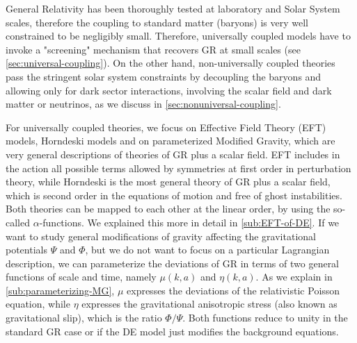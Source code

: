 General Relativity has been thoroughly tested at laboratory and Solar System scales, therefore the coupling to standard matter (baryons) is very well constrained to be negligibly small.
Therefore, universally coupled models have to invoke a "screening" mechanism that recovers GR at small scales (see \cref{sec:universal-coupling}).
On the other hand, non-universally coupled theories pass the stringent solar system constraints by decoupling the baryons
and allowing only for dark sector interactions, involving the scalar field and dark matter or neutrinos, as we discuss in \cref{sec:nonuniversal-coupling}.

For universally coupled theories, we focus on Effective Field Theory (EFT) models, Horndeski models and on parameterized Modified Gravity, which
are very general descriptions of theories of GR plus a scalar field.
EFT includes in the action all possible terms allowed by symmetries at first order in perturbation theory, while Horndeski is the most general theory
of GR plus a scalar field, which is second order in the equations of motion and free of ghost instabilities.
Both theories can be mapped to each other at the linear order, by using the so-called $\alpha$-functions.
We explained this more in detail in \cref{sub:EFT-of-DE}.
If we want to study general modifications of gravity affecting the gravitational potentials $\Psi$ and $\Phi$, but we do not want to focus on a particular Lagrangian description, we can parameterize the deviations of GR in terms of two
general functions of scale and time, namely $\mu(k,a)$ and $\eta(k,a)$. As we explain in \cref{sub:parameterizing-MG}, $\mu$ expresses the deviations of the relativistic Poisson equation, while $\eta$
expresses the gravitational anisotropic stress (also known as gravitational slip), which is the ratio $\Phi/\Psi$.
Both functions reduce to unity in the standard GR case or if the DE model just modifies the background equations.

